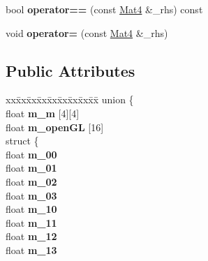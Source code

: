 \begin{DoxyCompactItemize}
\item 
\hypertarget{classMat4_a58b6e834b108c2f7440e4b49b0a313b8}{bool {\bfseries operator==} (const \hyperlink{classMat4}{Mat4} \&\-\_\-rhs) const }\label{classMat4_a58b6e834b108c2f7440e4b49b0a313b8}

\item 
\hypertarget{classMat4_aee79ca8277bdfbf7128d4550e4fbd3c4}{void {\bfseries operator=} (const \hyperlink{classMat4}{Mat4} \&\-\_\-rhs)}\label{classMat4_aee79ca8277bdfbf7128d4550e4fbd3c4}

\end{DoxyCompactItemize}
\subsection*{Public Attributes}
\begin{DoxyCompactItemize}
\item 
\hypertarget{classMat4_a7ac5cb8a67c6c9940052901b50156d2d}{\begin{tabbing}
xx\=xx\=xx\=xx\=xx\=xx\=xx\=xx\=xx\=\kill
union \{\\
\hypertarget{unionMat4_1_1@1_a814619c2bc230d3d1b52dc1e72e33a10}{\>float {\bfseries m\_m} \mbox{[}4\mbox{]}\mbox{[}4\mbox{]}\\
\hypertarget{unionMat4_1_1@1_a81fc8afe42c23614ab86549aaf2f384c}{\>float {\bfseries m\_openGL} \mbox{[}16\mbox{]}\\
\hypertarget{unionMat4_1_1@1_a1d704e3ce1989ae72b711e825fe07ddc}{\>struct \{\\
\hypertarget{structMat4_1_1@1_1_1@3_a63ea3c0d4b9a6f53e33e33f1a0de23c0}{\>\>float {\bfseries m\_00}\\
\hypertarget{structMat4_1_1@1_1_1@3_ab9e74db6fa2e1b95683c347b34df4ea4}{\>\>float {\bfseries m\_01}\\
\hypertarget{structMat4_1_1@1_1_1@3_af0a3595e5a7fc1eac093faf648539e3d}{\>\>float {\bfseries m\_02}\\
\hypertarget{structMat4_1_1@1_1_1@3_aff54f200fc9d27b0c360ef20114585b2}{\>\>float {\bfseries m\_03}\\
\hypertarget{structMat4_1_1@1_1_1@3_a2db5bf4792a33eb8bc726d3bd8dcb522}{\>\>float {\bfseries m\_10}\\
\hypertarget{structMat4_1_1@1_1_1@3_a6ebbf9e1c9e8dd962bcf5715cc03ab29}{\>\>float {\bfseries m\_11}\\
\hypertarget{structMat4_1_1@1_1_1@3_a2a512d694359d9db4771181c36e11299}{\>\>float {\bfseries m\_12}\\
\hypertarget{structMat4_1_1@1_1_1@3_ad63b55e5293017b3534a429bc825bbda}{\>\>float {\bfseries m\_13}\\
}}}}}}}}}}}
\end{tabbing}}
\end{DoxyCompactItemize}
